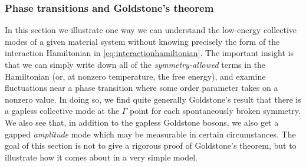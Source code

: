 \subsubsection{Phase transitions and Goldstone's theorem}\label{sec:superfluidgoldstone}

In this section we illustrate one way we can understand the low-energy collective modes of a given material system without knowing precisely the form of the interaction Hamiltonian in \cref{eq:interactionhamiltonian}.
The important insight is that we can simply write down all of the \emph{symmetry-allowed} terms in the Hamiltonian (or, at nonzero temperature, the free energy), and examine fluctuations near a phase transition where some order parameter takes on a nonzero value.
In doing so, we find quite generally Goldstone's result that there is a gapless collective mode at the $\Gamma$ point for each spontaneously broken symmetry.
We also see that, in addition to the gapless Goldstone bosons, we also get a gapped \emph{amplitude} mode which may be measurable in certain circumstances.
The goal of this section is not to give a rigorous proof of Goldstone's theorem, but to illustrate how it comes about in a very simple model.

